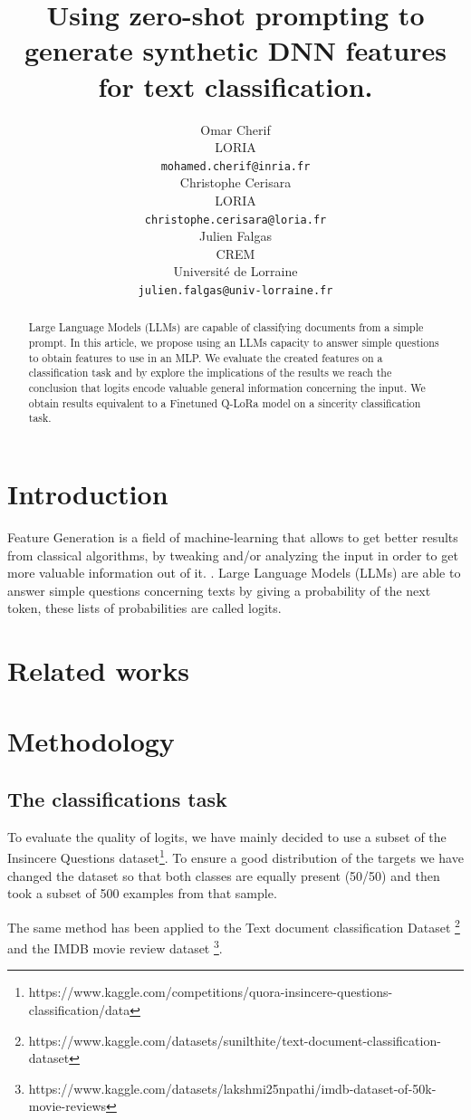 \documentclass[11pt]{article}
\title{Using zero-shot prompting to generate synthetic DNN features for text classification.}
\author{Omar Cherif \\
  LORIA \\
  \texttt{mohamed.cherif@inria.fr} \\\And
  Christophe Cerisara \\
  LORIA\\
  \texttt{christophe.cerisara@loria.fr}  \\\AND
  Julien Falgas \\
  CREM\\
  Université de Lorraine \\
  \texttt{julien.falgas@univ-lorraine.fr} \\}
\begin{document}
\maketitle
\begin{abstract}
Large Language Models (LLMs) are capable of classifying documents from a simple prompt. In this article, we propose using an LLMs capacity to answer simple questions to obtain features to use in an MLP. We evaluate the created features on a classification task and by explore the implications of the results we reach the conclusion that logits encode valuable general information concerning the input. We obtain results equivalent to a Finetuned Q-LoRa model on a sincerity classification task.
\end{abstract}

\section{Introduction}

Feature Generation is a field of machine-learning that allows to get better results from classical algorithms, by tweaking and/or analyzing the input in order to get more valuable information out of it. \citep{florescuAlgorithmicallyGeneratingNew2019}. Large Language Models (LLMs) are able to answer simple questions concerning texts by giving a probability of the next token, these lists of probabilities are called logits. 

\section{Related works}


\section{Methodology}
\subsection{The classifications task}
To evaluate the quality of logits, we have mainly decided to use a subset of the Insincere Questions dataset\footnote{https://www.kaggle.com/competitions/quora-insincere-questions-classification/data}. To ensure a good distribution of the targets we have changed the dataset so that both classes are equally present (50/50) and then took a subset of 500 examples from that sample.

The same method has been applied to the Text document classification Dataset \footnote{https://www.kaggle.com/datasets/sunilthite/text-document-classification-dataset} and the IMDB movie review dataset \footnote{https://www.kaggle.com/datasets/lakshmi25npathi/imdb-dataset-of-50k-movie-reviews}.
\end{document}
